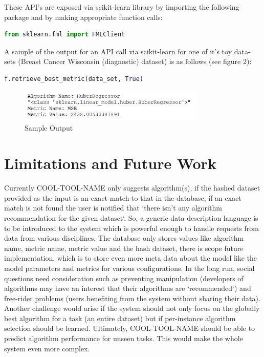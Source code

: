 \documentclass{article}
\begin{document}
These API's are exposed via scikit-learn library by importing the following package and by making appropriate function calls:
\begin{lstlisting}[language=python]
from sklearn.fml import FMLClient
\end{lstlisting}

A sample of the output for an API call via scikit-learn for one of it's toy data-sets (Breast Cancer Wisconsin (diagnostic) dataset) is as follows (see figure 2):
\begin{lstlisting}[language=python]
f.retrieve_best_metric(data_set, True)
\end{lstlisting}
\begin{figure}[h]
    \centering
    \includegraphics[width=3.5in]{sample-output.PNG}
    \caption{Sample Output}
    \label{sample-output}
\end{figure}


\section{Limitations and Future Work}
Currently COOL-TOOL-NAME only suggests algorithm(s), if the hashed dataset provided as the input is an exact match to that in the database, if an exact match is not found the user is notified that `there isn’t any algorithm recommendation for the given dataset`. So, a generic data description language is to be introduced to the system which is powerful enough to handle requests from data from various disciplines. The database only stores values like algorithm name, metric name, metric value and the hash dataset, there is scope  future implementation, which is to store even more meta data about the model like the model parameters and metrics for various configurations. In the long run, social questions need consideration such as preventing manipulation (developers of algorithms may have an interest that their algorithms are `recommended`) and free-rider problems (users benefiting from the system without sharing their data). Another challenge would arise if the system should not only focus on the globally best algorithm for a task (an entire dataset) but if per-instance algorithm selection should be learned. Ultimately, COOL-TOOL-NAME should be able to predict algorithm performance for unseen tasks. This would make the whole system even more complex.
\end{document}
